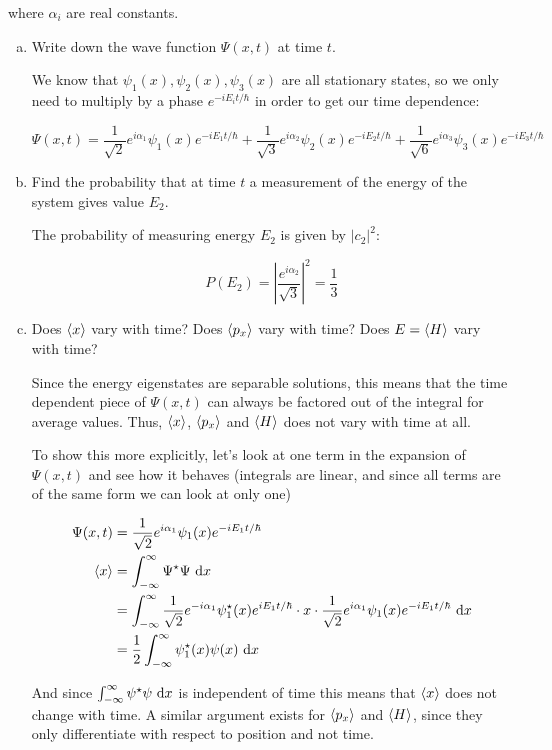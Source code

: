 \documentclass[10pt]{article}
\begin{document}
    where $\alpha_i$ are real constants.

    \begin{enumerate}[(a)]
        \item Write down the wave function $\Psi(x, t)$ at time $t$. 
        
        \begin{solution}
            We know that $\psi_1(x), \psi_2(x), \psi_3(x)$ are all stationary states, so we only need to multiply by a phase $e^{-iE_it/\hbar}$ in order to get our time dependence:

            \[ \Psi(x, t) = \frac{1}{\sqrt 2} e^{i\alpha_1}\psi_1(x) e^{-iE_1t/\hbar} + \frac{1}{\sqrt 3}e^{i\alpha_2}\psi_2(x)e^{-iE_2t/\hbar} + \frac{1}{\sqrt 6}e^{i\alpha_3}\psi_3(x)e^{-iE_3t/\hbar}\]
        \end{solution}
        \item Find the probability that at time $t$ a measurement of the energy of the system gives value $E_2$. 
        
        \begin{solution}
            The probability of measuring energy $E_2$ is given by $|c_2|^2$:

            \[P(E_2) = \left|\frac{e^{i\alpha_2}}{\sqrt{3}}\right|^2 = \frac{1}{3}\]
        \end{solution}
        \item Does $\langle x \rangle$ vary with time? Does $\langle p_x \rangle$ vary with time? Does $E = \langle H \rangle$ vary with time?
        
        \begin{solution}
           Since the energy eigenstates are separable solutions, this means that the time dependent piece of $\Psi(x, t)$ can always be factored out of the integral for average values. Thus, $\langle x \rangle$, $\langle p_x \rangle$ and $\langle H \rangle$ does not vary with time at all. 
           
           To show this more explicitly, let's look at one term in the expansion of $\Psi(x, t)$ and see how it behaves (integrals are linear, and since all terms are of the same form we can look at only one)


           \begin{align*}
                \Psi(x, t) &= \frac{1}{\sqrt 2}e^{i\alpha_1}\psi_1(x) e^{-iE_1t/\hbar}\\
                \langle x \rangle &= \int_{-\infty}^{\infty} \Psi^\star \Psi \ \mathrm d x\\
                &= \int_{-\infty}^{\infty} \frac{1}{\sqrt{2}}e^{-i\alpha_1}\psi_1^\star(x)e^{iE_1t/\hbar} \cdot x \cdot \frac{1}{\sqrt{2}}e^{i\alpha_1}\psi_1(x)e^{-iE_1t/\hbar} \ \mathrm d x\\
                &= \frac{1}{2}\int_{-\infty}^{\infty} \psi^\star_1(x) \psi(x) \ \mathrm d x
           \end{align*}

           And since $\int_{-\infty}^{\infty} \psi^\star \psi \ \mathrm d x$ is independent of time this means that $\langle x \rangle$ does not change with time. A similar argument exists for $\langle p_x \rangle$ and $\langle H \rangle$, since they only differentiate with respect to position and not time.
        \end{solution}
    \end{enumerate}
    
\end{document}
